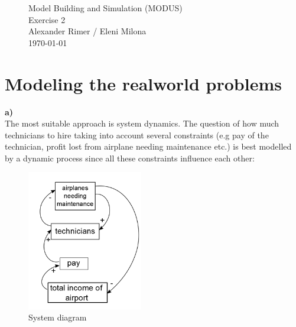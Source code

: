 \begin{figure}
\centering
{\Huge Model Building and Simulation (MODUS)}\\[0.5cm]
{\Huge Exercise 2}\\[0.5cm]
{\Large Alexander Rimer / Eleni Milona}\\[0.6cm]  
\today
\end{figure}

\section{Modeling the realworld problems}
\textbf{a)}\\
The most suitable approach is system dynamics. The question of how much technicians to hire 
taking into account several constraints (e.g pay of the technician, profit lost from airplane needing maintenance etc.) 
is best modelled by a dynamic process since all these constraints influence each other:
 
\begin{figure}[!htb]
  \centering  
  \includegraphics[width=0.45\textwidth]{pics/diaUB2} 
  \caption{System diagram}
  \label{fig:system_dia} 
 \end{figure}
  
